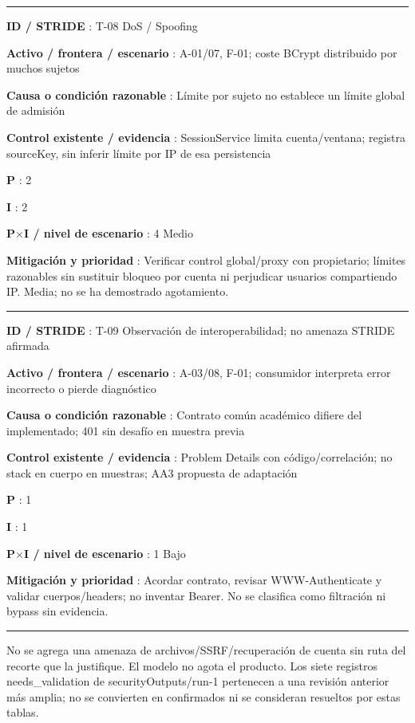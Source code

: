 \documentclass[12pt,a4paper]{report}
\begin{document}
\medskip\hrule\medskip

\textbf{ID / STRIDE }: T-08 DoS / Spoofing

\textbf{Activo / frontera / escenario }: A-01/07, F-01; coste BCrypt
distribuido por muchos sujetos

\textbf{Causa o condición razonable }: Límite por sujeto no establece un
límite global de admisión

\textbf{Control existente / evidencia }: SessionService limita
cuenta/ventana; registra sourceKey, sin inferir límite por IP de esa
persistencia

\textbf{P }: 2

\textbf{I }: 2

\textbf{P\ensuremath{\times}I / nivel de escenario }: 4 Medio

\textbf{Mitigación y prioridad }: Verificar control global/proxy con
propietario; límites razonables sin sustituir bloqueo por cuenta ni
perjudicar usuarios compartiendo IP. Media; no se ha demostrado
agotamiento.

\medskip\hrule\medskip

\textbf{ID / STRIDE }: T-09 Observación de interoperabilidad; no amenaza
STRIDE afirmada

\textbf{Activo / frontera / escenario }: A-03/08, F-01; consumidor
interpreta error incorrecto o pierde diagnóstico

\textbf{Causa o condición razonable }: Contrato común académico difiere
del implementado; 401 sin desafío en muestra previa

\textbf{Control existente / evidencia }: Problem Details con
código/correlación; no stack en cuerpo en muestras; AA3 propuesta de
adaptación

\textbf{P }: 1

\textbf{I }: 1

\textbf{P\ensuremath{\times}I / nivel de escenario }: 1 Bajo

\textbf{Mitigación y prioridad }: Acordar contrato, revisar
WWW-Authenticate y validar cuerpos/headers; no inventar Bearer. No se
clasifica como filtración ni bypass sin evidencia.

\medskip\hrule\medskip

No se agrega una amenaza de archivos/SSRF/recuperación de cuenta sin
ruta del recorte que la justifique. El modelo no agota el producto. Los
siete registros needs\_validation de securityOutputs/run-1 pertenecen a
una revisión anterior más amplia; no se convierten en confirmados ni se
consideran resueltos por estas tablas.
\end{document}

